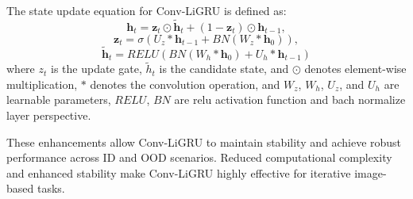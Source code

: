 The state update equation for Conv-LiGRU is defined as:
   \begin{equation}
       \textbf{h}_t = \textbf{z}_t \odot \tilde{\textbf{h}}_t + (1 - \textbf{z}_t) \odot \textbf{h}_{t-1},
   \end{equation}
   \begin{equation}
       \textbf{z}_t = \sigma(U_z \ast \textbf{h}_{t-1} + BN(W_z \ast \textbf{h}_0)),
   \end{equation}
   \begin{equation}
       \tilde{\textbf{h}}_t = RELU(BN(W_h \ast \textbf{h}_0) + U_h \ast \textbf{h}_{t-1})
   \end{equation}
where \( z_t \) is the update gate, \( \tilde{h}_t \) is the candidate state, and \( \odot \) denotes element-wise multiplication, \( \ast \) denotes the convolution operation, and \( W_z \), \( W_h \), \( U_z \), and \( U_h \) are learnable parameters, $RELU$, $BN$ are relu activation function and bach normalize layer perspective.

These enhancements allow Conv-LiGRU to maintain stability and achieve robust performance across ID and OOD scenarios. 
Reduced computational complexity and enhanced stability make Conv-LiGRU highly effective for iterative image-based tasks.

